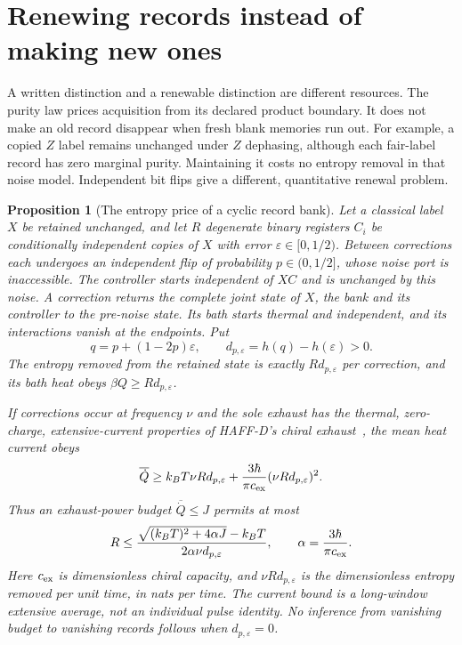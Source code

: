 \documentclass[12pt,a4paper]{article}
\newtheorem{proposition}[theorem]{Proposition}
\begin{document}
\section{Renewing records instead of making new ones}
\label{sec:maintenance}

A written distinction and a renewable distinction are different resources.
The purity law prices acquisition from its declared product boundary. It
does not make an old record disappear when fresh blank memories run out.
For example, a copied $Z$ label remains unchanged under $Z$ dephasing,
although each fair-label record has zero marginal purity. Maintaining it
costs no entropy removal in that noise model. Independent bit flips give
a different, quantitative renewal problem.

\begin{proposition}[The entropy price of a cyclic record bank]
\label{prop:renewal}
Let a classical label $X$ be retained unchanged, and let $R$ degenerate
binary registers $C_i$ be conditionally independent copies of $X$ with
error $\varepsilon\in[0,1/2)$. Between corrections each undergoes an
independent flip of probability $p\in(0,1/2]$, whose noise port is
inaccessible. The controller starts independent of $XC$ and is unchanged
by this noise. A correction returns the complete joint state of $X$, the
bank and its controller to the pre-noise state. Its bath starts thermal
and independent, and its interactions vanish at the endpoints. Put
\begin{equation}\label{eq:renewal-entropy}
 q=p+(1-2p)\varepsilon,\qquad
 d_{p,\varepsilon}=h(q)-h(\varepsilon)>0.
\end{equation}
The entropy removed from the retained state is exactly
$R d_{p,\varepsilon}$ per correction, and its bath heat obeys
$\beta Q\ge R d_{p,\varepsilon}$.

If corrections occur at frequency $\nu$ and the sole exhaust has the
thermal, zero-charge, extensive-current properties of HAFF-D's chiral
exhaust~\cite{Liu2026PaperD}, the mean heat current obeys
\begin{equation}\label{eq:renewal-current}
 \overline{\dot Q}\ge k_BT\nu R d_{p,\varepsilon}
 +\frac{3\hbar}{\pi c_{\rm ex}}(\nu R d_{p,\varepsilon})^2.
\end{equation}
Thus an exhaust-power budget $\overline{\dot Q}\le J$ permits at most
\begin{equation}\label{eq:renewal-capacity}
 R\le\frac{\sqrt{(k_BT)^2+4\alpha J}-k_BT}
 {2\alpha\nu d_{p,\varepsilon}},\qquad
 \alpha=\frac{3\hbar}{\pi c_{\rm ex}}.
\end{equation}
Here $c_{\rm ex}$ is dimensionless chiral capacity, and $\nu R d_{p,\varepsilon}$
is the dimensionless entropy removed per unit time, in nats per time.
The current bound is a long-window extensive average, not an individual
pulse identity.
No inference from vanishing budget to vanishing records follows when
$d_{p,\varepsilon}=0$.
\end{proposition}
\end{document}
